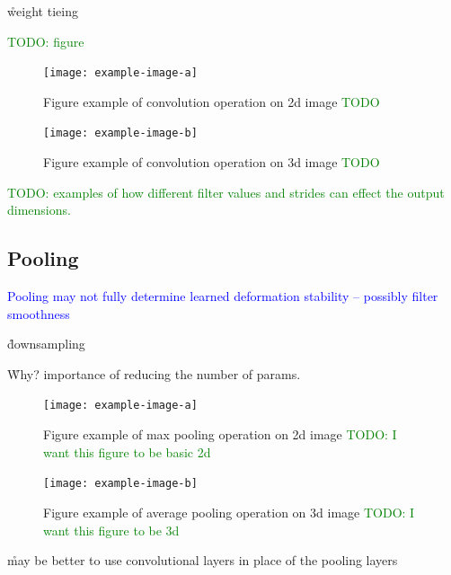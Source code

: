 
\r{weight tieing}


\textcolor{green}{TODO: figure}

\begin{figure}[htp]
	\centering
	\texttt{[image: example-image-a]}\hfil
	\caption{Figure example of convolution operation on 2d image \textcolor{green}{TODO}}
	\label{fig:conv_2d_example_calc}
\end{figure}

\begin{figure}[htp]
	\centering
	\texttt{[image: example-image-b]}\hfil
	\caption{Figure example of convolution operation on 3d image \textcolor{green}{TODO}}
	\label{fig:conv_2d_depth_example_calc}
\end{figure}

\textcolor{green}{TODO: examples of how different filter values and strides can effect the output dimensions.}




\subsection{Pooling}


\textcolor{blue}{Pooling may not fully determine learned deformation stability -- possibly filter smoothness\cite{ruderman2018learned}}

\r{downsampling}

\r{Why? importance of reducing the number of params.}




\begin{figure}[htp]
	\centering
	\texttt{[image: example-image-a]}\hfil
	\caption{Figure example of max pooling operation on 2d image \textcolor{green}{TODO: I want this figure to be basic 2d}}
	\label{fig:pooling_max_2d_ex_a}
\end{figure}

\begin{figure}[htp]
	\centering
	\texttt{[image: example-image-b]}\hfil
	\caption{Figure example of average pooling operation on 3d image \textcolor{green}{TODO: I want this figure to be 3d}}
	\label{fig:pooling_avg_3d_ex_a}
\end{figure}


\r{may be better to use convolutional layers in place of the pooling layers\cite{springenberg2014striving}}
